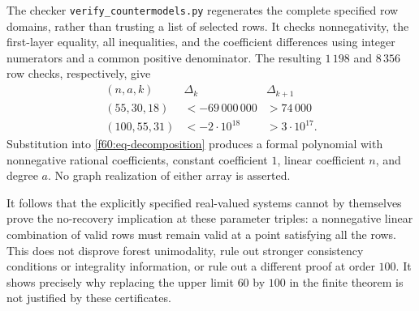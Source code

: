 The checker \texttt{verify\_countermodels.py} regenerates the complete
specified row domains, rather than trusting a list of selected rows.
It checks nonnegativity, the first-layer equality, all inequalities,
and the coefficient differences using integer numerators and a common
positive denominator.  The resulting $1\,198$ and $8\,356$ row checks,
respectively, give
\begin{equation}
\begin{array}{c|cc}
 (n,a,k)&\Delta_k&\Delta_{k+1}\\
 \hline
 (55,30,18)&<-69\,000\,000&>74\,000\\
 (100,55,31)&<-2\cdot10^{18}&>3\cdot10^{17}.
\end{array}
 \label{f60:eq-countermodel-differences}
\end{equation}
Substitution into \eqref{f60:eq-decomposition} produces a formal
polynomial with nonnegative rational coefficients, constant coefficient
$1$, linear coefficient $n$, and degree $a$.  No graph realization of
either array is asserted.

It follows that the explicitly specified real-valued systems cannot
by themselves prove the no-recovery implication at these parameter
triples: a nonnegative linear combination of valid rows must remain
valid at a point satisfying all the rows.  This does not disprove
forest unimodality, rule out stronger consistency conditions or
integrality information, or rule out a different proof at order $100$.
It shows precisely why replacing the upper limit $60$ by $100$ in the
finite theorem is not justified by these certificates.
